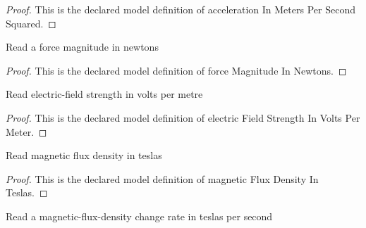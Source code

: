 \begin{proof}
  This is the declared model definition of acceleration In Meters Per Second Squared.
\end{proof}
\begin{definition}
  \label{def:physics:phyx-mini-0927:phyxminiproblems-problemphyxmini0927-forcemagnitudeinnewtons}
  Read a force magnitude in newtons
\end{definition}
\begin{proof}
  This is the declared model definition of force Magnitude In Newtons.
\end{proof}
\begin{definition}
  \label{def:physics:phyx-mini-0927:phyxminiproblems-problemphyxmini0927-electricfieldstrengthinvoltspermeter}
  Read electric-field strength in volts per metre
\end{definition}
\begin{proof}
  This is the declared model definition of electric Field Strength In Volts Per Meter.
\end{proof}
\begin{definition}
  \label{def:physics:phyx-mini-0927:phyxminiproblems-problemphyxmini0927-magneticfluxdensityinteslas}
  Read magnetic flux density in teslas
\end{definition}
\begin{proof}
  This is the declared model definition of magnetic Flux Density In Teslas.
\end{proof}
\begin{definition}
  \label{def:physics:phyx-mini-0927:phyxminiproblems-problemphyxmini0927-magneticfluxdensityrateinteslaspersecond}
  Read a magnetic-flux-density change rate in teslas per second
\end{definition}

